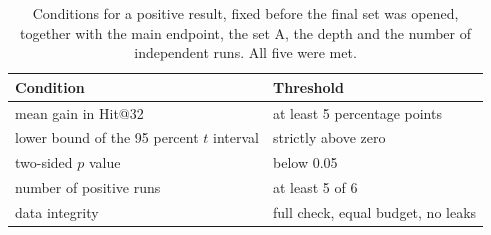 \begin{table}[!tbh]
\centering\footnotesize\setlength{\tabcolsep}{6pt}
\begin{tabular}{|p{.46\linewidth}|l|}
\hline
\textbf{Condition} & \textbf{Threshold} \\
\hline
mean gain in Hit@32 & at least 5 percentage points \\ \hline
lower bound of the 95 percent $t$ interval & strictly above zero \\ \hline
two-sided $p$ value & below 0.05 \\ \hline
number of positive runs & at least 5 of 6 \\ \hline
data integrity & full check, equal budget, no leaks \\ \hline
\end{tabular}
\caption{Conditions for a positive result, fixed before the final set was opened,
together with the main endpoint, the set A, the depth and the number of independent
runs. All five were met.}
\label{tab:conditions}
\end{table}
